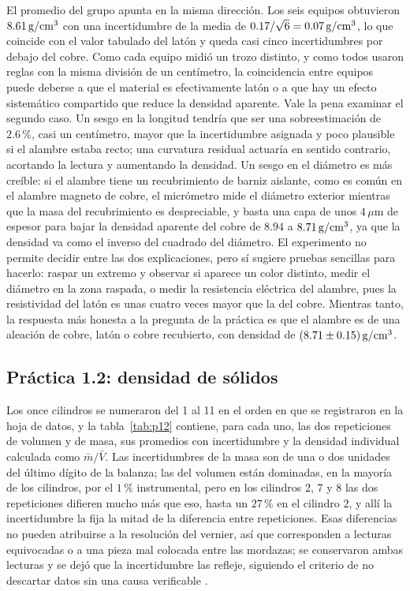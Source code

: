 El promedio del grupo apunta en la misma dirección. Los seis equipos obtuvieron $8.61\,\mathrm{g/cm^{3}}$ con una incertidumbre de la media de $0.17/\sqrt{6} = 0.07\,\mathrm{g/cm^{3}}$, lo que coincide con el valor tabulado del latón y queda casi cinco incertidumbres por debajo del cobre. Como cada equipo midió un trozo distinto, y como todos usaron reglas con la misma división de un centímetro, la coincidencia entre equipos puede deberse a que el material es efectivamente latón o a que hay un efecto sistemático compartido que reduce la densidad aparente. Vale la pena examinar el segundo caso. Un sesgo en la longitud tendría que ser una sobreestimación de $2.6\,\%$, casi un centímetro, mayor que la incertidumbre asignada y poco plausible si el alambre estaba recto; una curvatura residual actuaría en sentido contrario, acortando la lectura y aumentando la densidad. Un sesgo en el diámetro es más creíble: si el alambre tiene un recubrimiento de barniz aislante, como es común en el alambre magneto de cobre, el micrómetro mide el diámetro exterior mientras que la masa del recubrimiento es despreciable, y basta una capa de unos $4\,\mu\mathrm{m}$ de espesor para bajar la densidad aparente del cobre de $8.94$ a $8.71\,\mathrm{g/cm^{3}}$, ya que la densidad va como el inverso del cuadrado del diámetro. El experimento no permite decidir entre las dos explicaciones, pero sí sugiere pruebas sencillas para hacerlo: raspar un extremo y observar si aparece un color distinto, medir el diámetro en la zona raspada, o medir la resistencia eléctrica del alambre, pues la resistividad del latón es unas cuatro veces mayor que la del cobre. Mientras tanto, la respuesta más honesta a la pregunta de la práctica es que el alambre es de una aleación de cobre, latón o cobre recubierto, con densidad de $(8.71 \pm 0.15)\,\mathrm{g/cm^{3}}$.

\subsection{Práctica 1.2: densidad de sólidos}

Los once cilindros se numeraron del 1 al 11 en el orden en que se registraron en la hoja de datos, y la tabla~\ref{tab:p12} contiene, para cada uno, las dos repeticiones de volumen y de masa, sus promedios con incertidumbre y la densidad individual calculada como $\bar m/\bar V$. Las incertidumbres de la masa son de una o dos unidades del último dígito de la balanza; las del volumen están dominadas, en la mayoría de los cilindros, por el $1\,\%$ instrumental, pero en los cilindros 2, 7 y 8 las dos repeticiones difieren mucho más que eso, hasta un $27\,\%$ en el cilindro 2, y allí la incertidumbre la fija la mitad de la diferencia entre repeticiones. Esas diferencias no pueden atribuirse a la resolución del vernier, así que corresponden a lecturas equivocadas o a una pieza mal colocada entre las mordazas; se conservaron ambas lecturas y se dejó que la incertidumbre las refleje, siguiendo el criterio de no descartar datos sin una causa verificable \cite{coleman}.

